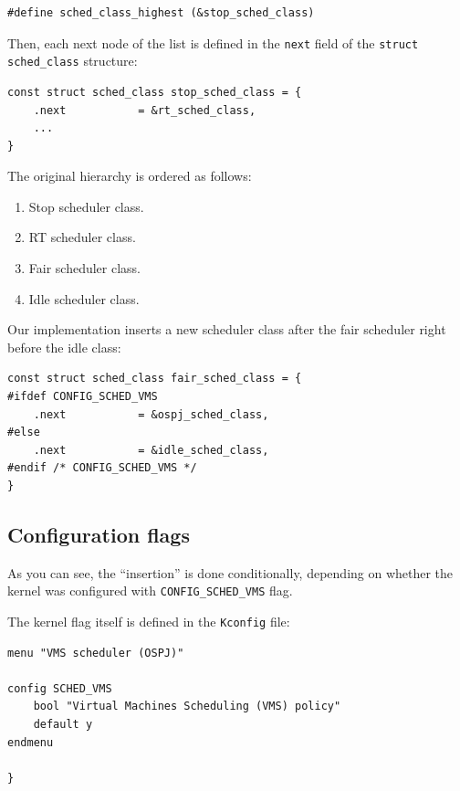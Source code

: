\documentclass[]{report}
\begin{document}
\begin{lstlisting}[style=c, caption=kernel/sched/sched.h, firstnumber=1041]
#define sched_class_highest (&stop_sched_class)
\end{lstlisting}

Then, each next node of the list is defined in the \lstinline!next!
field of the \lstinline!struct sched_class! structure:

\begin{lstlisting}[style=c, caption=Designated initializer in kernel/sched/sched.h, firstnumber=105]
const struct sched_class stop_sched_class = {
    .next           = &rt_sched_class,
    ...
}
\end{lstlisting}

The original hierarchy is ordered as follows:

\begin{enumerate}
\def\labelenumi{\arabic{enumi}.}
\itemsep1pt\parskip0pt
\item
  Stop scheduler class.
\item
  RT scheduler class.
\item
  Fair scheduler class.
\item
  Idle scheduler class.
\end{enumerate}

Our implementation inserts a new scheduler class after the fair
scheduler right before the idle class:

\begin{lstlisting}[style=c, caption=fair.c, firstnumber=6167]
const struct sched_class fair_sched_class = {
#ifdef CONFIG_SCHED_VMS
    .next           = &ospj_sched_class,
#else
    .next           = &idle_sched_class,
#endif /* CONFIG_SCHED_VMS */
}
\end{lstlisting}

\subsection{Configuration flags}\label{configuration-flags}

As you can see, the ``insertion'' is done conditionally, depending on
whether the kernel was configured with \lstinline!CONFIG_SCHED_VMS!
flag.

The kernel flag itself is defined in the \lstinline!Kconfig! file:

\begin{lstlisting}[style=c, caption=/Kernel/arch/x86/Kconfig, firstnumber=2334]
menu "VMS scheduler (OSPJ)"

config SCHED_VMS
    bool "Virtual Machines Scheduling (VMS) policy"
    default y
endmenu

}
\end{lstlisting}
\end{document}
